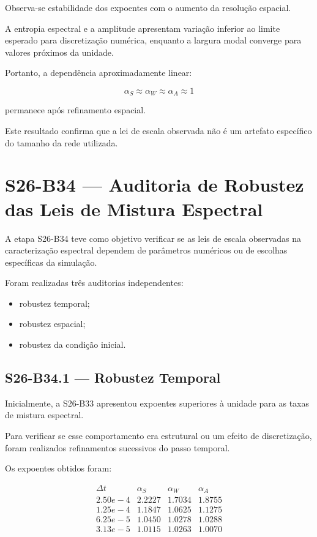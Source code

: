 \documentclass[11pt,a4paper]{article}
\begin{document}
Observa-se estabilidade dos expoentes com o aumento da resolução
espacial.

A entropia espectral e a amplitude apresentam variação inferior ao
limite esperado para discretização numérica, enquanto a largura
modal converge para valores próximos da unidade.

Portanto, a dependência aproximadamente linear:

\[
\alpha_S\approx\alpha_W\approx\alpha_A\approx1
\]

permanece após refinamento espacial.

Este resultado confirma que a lei de escala observada não é um
artefato específico do tamanho da rede utilizada.
\section{S26-B34 — Auditoria de Robustez das Leis de Mistura Espectral}

A etapa S26-B34 teve como objetivo verificar se as leis de escala
observadas na caracterização espectral dependem de parâmetros
numéricos ou de escolhas específicas da simulação.

Foram realizadas três auditorias independentes:

\begin{itemize}

\item robustez temporal;

\item robustez espacial;

\item robustez da condição inicial.

\end{itemize}


\subsection{S26-B34.1 — Robustez Temporal}

Inicialmente, a S26-B33 apresentou expoentes superiores à unidade
para as taxas de mistura espectral.

Para verificar se esse comportamento era estrutural ou um efeito
de discretização, foram realizados refinamentos sucessivos do
passo temporal.

Os expoentes obtidos foram:

\[
\begin{array}{c|ccc}
\Delta t &
\alpha_S &
\alpha_W &
\alpha_A
\\
\hline

2.50e-4 &
2.2227 &
1.7034 &
1.8755
\\

1.25e-4 &
1.1847 &
1.0625 &
1.1275
\\

6.25e-5 &
1.0450 &
1.0278 &
1.0288
\\

3.13e-5 &
1.0115 &
1.0263 &
1.0070
\\

\end{array}
\]
\end{document}
